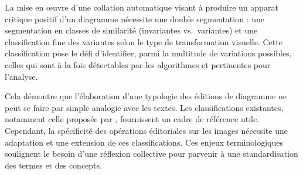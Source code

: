 La mise en œuvre d'une collation automatique visant à produire un
apparat critique positif d'un diagramme nécessite une double
segmentation : une segmentation en classes de similarité (invariantes
vs.~variantes) et une classification fine des variantes selon le type de
transformation visuelle. Cette classification pose le défi d'identifier,
parmi la multitude de variations possibles, celles qui sont à la fois
détectables par les algorithmes et pertinentes pour l'analyse.

Cela démontre que l'élaboration d'une typologie des éditions de
diagramme ne peut se faire par simple analogie avec les textes. Les
classifications existantes, notamment celle proposée par \dishas,
fournissent un cadre de référence utile. Cependant, la spécificité des
opérations éditoriales sur les images nécessite une adaptation et une
extension de ces classifications. Ces enjeux terminologiques soulignent
le besoin d'une réflexion collective pour parvenir à une standardisation
des termes et des concepts.

